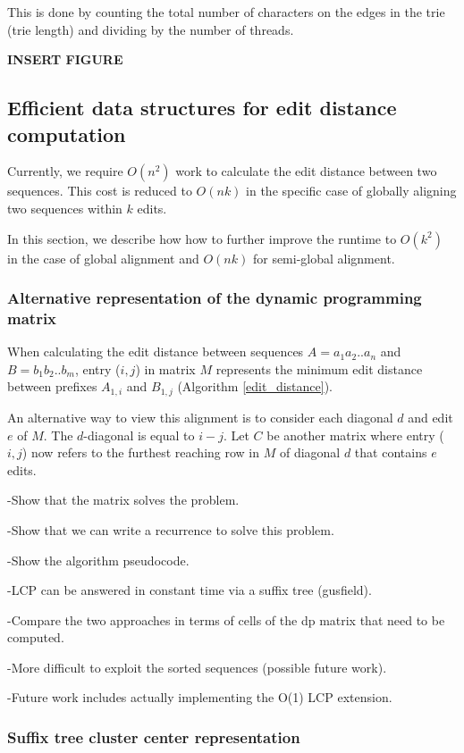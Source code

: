 This is done by counting the total number of characters on the edges in the trie (trie length) and dividing by the number of threads.

{\bf INSERT FIGURE}


\subsection{Efficient data structures for edit distance computation}

Currently, we require $O(n^2)$ work to calculate the edit distance between two sequences.
This cost is reduced to $O(nk)$ in the specific case of globally aligning two sequences within $k$ edits.

In this section, we describe how how to further improve the runtime to $O(k^2)$ in the case of global alignment and $O(nk)$ for semi-global alignment.

\subsubsection{Alternative representation of the dynamic programming matrix}
When calculating the edit distance between sequences $A = a_1 a_2 .. a_n$ and $B = b_1 b_2 .. b_m$, entry ($i,j$) in matrix $M$ represents the minimum edit distance between prefixes $A_{1,i}$ and $B_{1,j}$ (Algorithm \ref{edit_distance}).

An alternative way to view this alignment is to consider each diagonal $d$ and edit $e$ of $M$.  The $d$-diagonal is equal to $i-j$.
Let $C$ be another matrix where entry ($i,j$) now refers to the furthest reaching row in $M$ of diagonal $d$ that contains $e$ edits.

-Show that the matrix solves the problem.

-Show that we can write a recurrence to solve this problem.

-Show the algorithm pseudocode.

-LCP can be answered in constant time via a suffix tree (gusfield).

-Compare the two approaches in terms of cells of the dp matrix that need to be computed.

-More difficult to exploit the sorted sequences (possible future work).

-Future work includes actually implementing the O(1) LCP extension.

\subsubsection{Suffix tree cluster center representation}

